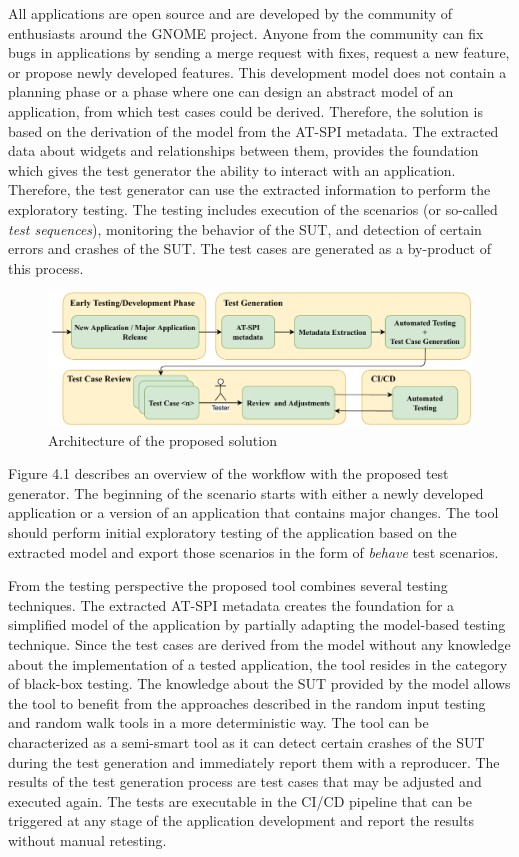 All applications are open source and are developed by the community of enthusiasts around the GNOME project. Anyone from the community can fix bugs in applications by sending a merge request with fixes, request a new feature, or propose newly developed features. This development model does not contain a planning phase or a phase where one can design an abstract model of an application, from which test cases could be derived. Therefore, the solution is based on the derivation of the model from the AT-SPI metadata. The extracted data about widgets and relationships between them, provides the foundation which gives the test generator the ability to interact with an application. Therefore, the test generator can use the extracted information to perform the exploratory testing. The testing includes execution of the scenarios (or so-called \textit{test sequences}), monitoring the behavior of the SUT, and detection of certain errors and crashes of the SUT. The test cases are generated as a by-product of this process.

\begin{figure}[hbt]
	\centering
	\includegraphics[width=1\textwidth]{obrazky-figures/overview.pdf}
	\caption{Architecture of the proposed solution}
	\label{Diagram}
\end{figure}

Figure 4.1 describes an overview of the workflow with the proposed test generator. The beginning of the scenario starts with either a newly developed application or a version of an application that contains major changes. The tool should perform initial exploratory testing of the application based on the extracted model and export those scenarios in the form of \textit{behave} test scenarios.

From the testing perspective the proposed tool combines several testing techniques. The extracted AT-SPI metadata creates the foundation for a simplified model of the application by partially adapting the model-based testing technique. Since the test cases are derived from the model without any knowledge about the implementation of a tested application, the tool resides in the category of black-box testing. The knowledge about the SUT provided by the model allows the tool to benefit from the approaches described in the random input testing and random walk tools in a more deterministic way. The tool can be characterized as a semi-smart tool as it can detect certain crashes of the SUT during the test generation and immediately report them with a reproducer. The results of the test generation process are test cases that may be adjusted and executed again. The tests are executable in the CI/CD pipeline that can be triggered at any stage of the application development and report the results without manual retesting.

